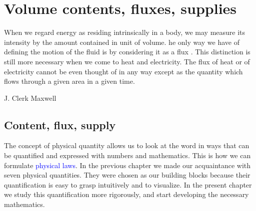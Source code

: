 \documentclass[a4paper,12pt,%
onecolumn,oneside,%
british%
]{memoir}
\newcommand{\mynotew}[1]{{\footnotesize\color{midgrey}\faIcon{tools}\ #1}}
\renewcommand*{\|}[1][]{\nonscript\:#1\vert\nonscript\:\mathopen{}}
\newcommand*{\sect}{\S}%
\renewcommand*{\autoref}[2]{\sidepar{\vspace{-1ex}\footnotesize{\color{blue}\faIcon{%
angle-right%
}\enskip\sect~\ref{#1} page~\pageref{#1}}}\textcolor{blue}{#2}}
\begin{document}
\printpagenotes*
\clearpage
\chapter{Volume contents, fluxes, supplies}
\label{cha:contents_fluxes}


\epigraph{%
When we regard energy as residing intrinsically in a body, we may measure its intensity by the amount contained in unit of volume. he only way we have of defining the motion of the fluid is by considering it as a flux \textelp{}. %
  This distinction is still more necessary when we come to heat and electricity. The flux of heat or of electricity cannot be even thought of in any way except as the quantity which flows through a given area in a given time.%
}{J. Clerk Maxwell \cites*{maxwell1869}}





\section{Content, flux, supply}
\label{sec:contentflux}

The concept of physical quantity allows us to look at the word in ways that can be quantified and expressed with numbers and mathematics. This is how we can formulate \autoref{sec:phys_laws0}{physical laws}. In the previous chapter we made our acquaintance with seven physical quantities. They were chosen as our building blocks because their quantification is easy to grasp intuitively and to visualize. In the present chapter we study this quantification more rigorously, and start developing the necessary mathematics.
\end{document}

